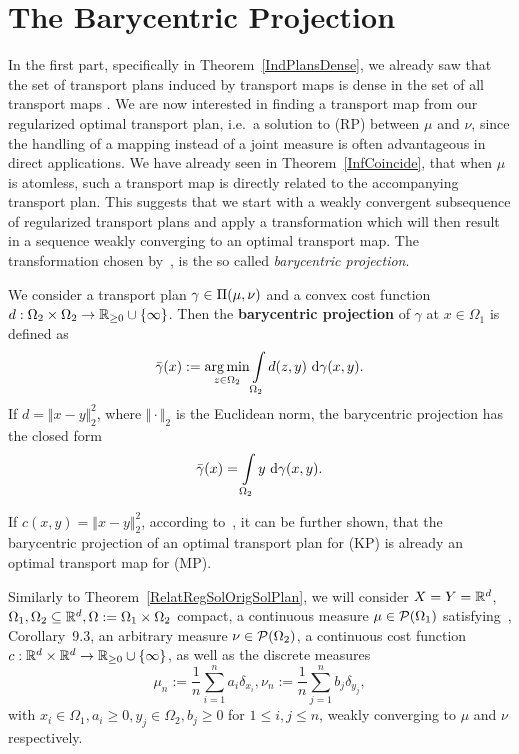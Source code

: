 \section{The Barycentric Projection}\label{BaryProj}

In the first part, specifically in Theorem~\ref{IndPlansDense}, we already saw that the set of transport plans induced by transport maps is dense in the set of all transport maps \TP{\mu}{\nu}. We are now interested in finding a transport map from our regularized optimal transport plan, i.e.~a solution to (RP) between $\mu$ and $\nu$, since the handling of a mapping instead of a joint measure is often advantageous in direct applications. We have already seen in Theorem~\ref{InfCoincide}, that when $\mu$ is atomless, such a transport map is directly related to the accompanying transport plan. This suggests that we start with a weakly convergent subsequence of regularized transport plans and apply a transformation which will then result in a sequence weakly converging to an optimal transport map. The transformation chosen by\ \cite{Seg2018}, is the so called \textit{barycentric projection}.

\begin{definition}\label{BarCentrProj}
	We consider a transport plan $\gamma \in \TP{\mu}{\nu}$ and a convex cost function $\map[d]{\Omega_2 \times \Omega_2}{\RZero \cup \{ \infty \}}$. Then the \textbf{barycentric projection} of $\gamma$ at $x \in \Omega_1$ is defined as
	\[ \bar{\gamma}(x) := \argmin\limits_{z \in \Omega_2} \int\limits_{\Omega_2} d(z, y)~\Dx[x, y]{\gamma}. \]
	If $d = \Vert x - y \Vert_2^2$, where $\Vert \cdot \Vert_2$ is the Euclidean norm, the barycentric projection has the closed form
	\[ \bar{\gamma}(x) = \int\limits_{\Omega_2} y~\Dx[x, y]{\gamma}. \]
\end{definition}

If $c(x, y) = \Vert x - y \Vert_2^2$, according to~\cite{Seg2018}, it can be further shown, that the barycentric projection of an optimal transport plan for (KP) is already an optimal transport map for (MP).

Similarly to Theorem~\ref{RelatRegSolOrigSolPlan}, we will consider $X = Y = \R^d$, $\Omega_1, \Omega_2 \subseteq \R^d, \Omega := \Omega_1 \times \Omega_2$ compact, a continuous measure $\mu \in \PM{\Omega_1}$ satisfying~\cite{Vill2009}, Corollary~9.3, an arbitrary measure $\nu \in \PM{\Omega_2}$, a continuous cost function $\map[c]{\R^d \times \R^d}{\RZero \cup \{ \infty \}}$, as well as the discrete measures
\[ \mu_n := \frac{1}{n} \sum\limits_{i = 1}^n a_i \delta_{x_i}, \nu_n := \frac{1}{n} \sum\limits_{j = 1}^n b_j \delta_{y_j}, \]
with $x_i \in \Omega_1, a_i \ge 0, y_j \in \Omega_2, b_j \ge 0$ for $1 \le i, j \le n$, weakly converging to $\mu$ and $\nu$ respectively.

